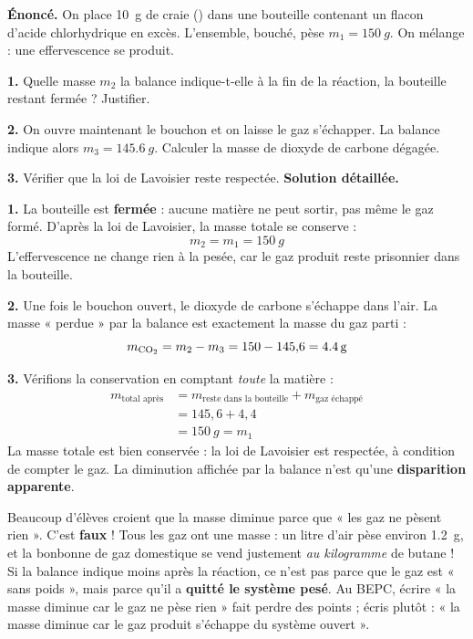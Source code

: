 \documentclass[11pt]{article}
\begin{document}
\begin{exoresolu}
\textbf{Énoncé.} On place \SI{10}{g} de craie () dans une bouteille contenant un flacon d'acide chlorhydrique en excès. L'ensemble, bouché, pèse $m_1 = \SI{150}{g}$. On mélange : une effervescence se produit.

\textbf{1.} Quelle masse $m_2$ la balance indique-t-elle à la fin de la réaction, la bouteille restant fermée ? Justifier.

\textbf{2.} On ouvre maintenant le bouchon et on laisse le gaz s'échapper. La balance indique alors $m_3 = \SI{145,6}{g}$. Calculer la masse de dioxyde de carbone dégagée.

\textbf{3.} Vérifier que la loi de Lavoisier reste respectée.
\tcblower
\textbf{Solution détaillée.}

\textbf{1.} La bouteille est \textbf{fermée} : aucune matière ne peut sortir, pas même le gaz  formé. D'après la loi de Lavoisier, la masse totale se conserve :
\[ m_2 = m_1 = \SI{150}{g} \]
L'effervescence ne change rien à la pesée, car le gaz produit reste prisonnier dans la bouteille.

\textbf{2.} Une fois le bouchon ouvert, le dioxyde de carbone s'échappe dans l'air. La masse « perdue » par la balance est exactement la masse du gaz parti :
\[ m_{\ce{CO2}} = m_2 - m_3 = 150 - 145{,}6 = \SI{4,4}{g} \]

\textbf{3.} Vérifions la conservation en comptant \emph{toute} la matière :
\begin{align*}
m_{\text{total après}} &= m_{\text{reste dans la bouteille}} + m_{\text{gaz échappé}} \\
&= 145{,}6 + 4{,}4 \\
&= \SI{150}{g} = m_1
\end{align*}
La masse totale est bien conservée : la loi de Lavoisier est respectée, à condition de compter le gaz. La diminution affichée par la balance n'est qu'une \textbf{disparition apparente}.
\end{exoresolu}

\begin{attention}
Beaucoup d'élèves croient que la masse diminue parce que « les gaz ne pèsent rien ». C'est \textbf{faux} ! Tous les gaz ont une masse : un litre d'air pèse environ \SI{1,2}{g}, et la bonbonne de gaz domestique se vend justement \emph{au kilogramme} de butane ! Si la balance indique moins après la réaction, ce n'est pas parce que le gaz est « sans poids », mais parce qu'il a \textbf{quitté le système pesé}. Au BEPC, écrire « la masse diminue car le gaz ne pèse rien » fait perdre des points ; écris plutôt : « la masse diminue car le gaz produit s'échappe du système ouvert ».
\end{attention}
\end{document}
